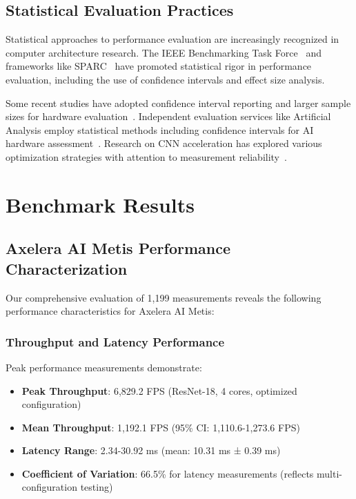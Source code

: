 \documentclass[journal]{IEEEtran}
\begin{document}
\subsection{Statistical Evaluation Practices}

Statistical approaches to performance evaluation are increasingly recognized in computer architecture research. The IEEE Benchmarking Task Force~\cite{ieee_benchmarking2022} and frameworks like SPARC~\cite{sparc_framework2021} have promoted statistical rigor in performance evaluation, including the use of confidence intervals and effect size analysis.

Some recent studies have adopted confidence interval reporting and larger sample sizes for hardware evaluation~\cite{fpga_accelerators2024}. Independent evaluation services like Artificial Analysis employ statistical methods including confidence intervals for AI hardware assessment~\cite{artificial_analysis2024}. Research on CNN acceleration has explored various optimization strategies with attention to measurement reliability~\cite{cnn_acceleration2024}.

\section{Benchmark Results}

\subsection{Axelera AI Metis Performance Characterization}

Our comprehensive evaluation of 1,199 measurements reveals the following performance characteristics for Axelera AI Metis:

\subsubsection{Throughput and Latency Performance}

Peak performance measurements demonstrate:
\begin{itemize}
    \item \textbf{Peak Throughput}: 6,829.2 FPS (ResNet-18, 4 cores, optimized configuration)
    \item \textbf{Mean Throughput}: 1,192.1 FPS (95\% CI: 1,110.6-1,273.6 FPS)
    \item \textbf{Latency Range}: 2.34-30.92 ms (mean: 10.31 ms ± 0.39 ms)
    \item \textbf{Coefficient of Variation}: 66.5\% for latency measurements (reflects multi-configuration testing)
\end{itemize}
\end{document}
